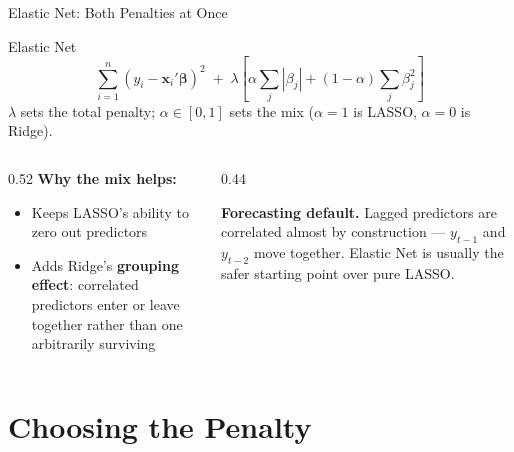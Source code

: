 \documentclass[aspectratio=169, 11pt]{beamer}
\begin{document}
\begin{frame}{Elastic Net: Both Penalties at Once}
  \begin{definitionbox}{Elastic Net \parencite{ZouHastie2005}}
    \[
      \sum_{i=1}^{n}(y_i - \mathbf{x}_i'\boldsymbol{\beta})^2
      \; + \; \lambda \left[ \alpha \sum_j |\beta_j|
      + (1-\alpha) \sum_j \beta_j^2 \right]
    \]
    $\lambda$ sets the total penalty; $\alpha \in [0,1]$ sets the mix
    ($\alpha=1$ is LASSO, $\alpha=0$ is Ridge).
  \end{definitionbox}
  \begin{columns}[T]
    \begin{column}{0.52\textwidth}
      \textbf{Why the mix helps:}
      \begin{itemize}\small\itemsep0pt
        \item Keeps LASSO's ability to zero out predictors
        \item Adds Ridge's \textbf{grouping effect}: correlated predictors
              enter or leave together rather than one arbitrarily surviving
      \end{itemize}
    \end{column}
    \begin{column}{0.44\textwidth}
      \begin{keybox}
        \small \textbf{Forecasting default.} Lagged predictors are correlated
        almost by construction --- $y_{t-1}$ and $y_{t-2}$ move together.
        Elastic Net is usually the safer starting point over pure LASSO.
      \end{keybox}
    \end{column}
  \end{columns}
\end{frame}

\section{Choosing the Penalty}

\end{document}
